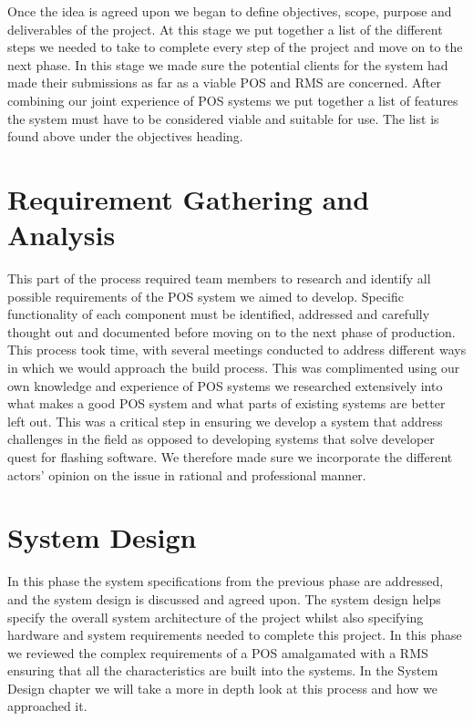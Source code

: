 Once the idea is agreed upon we began to define objectives, scope, purpose and deliverables of the project. At this stage we put together a list of the different steps we needed to take to complete every step of the project and move on to the next phase. In this stage we made sure the potential clients for the system had made their submissions as far as a viable POS and RMS are concerned.
After combining our joint experience of POS systems we put together a list of features the system must have to be considered viable and suitable for use. The list is found above under the objectives heading.

\section{Requirement Gathering and Analysis}

This part of the process required team members to research and identify all possible requirements of the POS system we aimed to develop. Specific functionality of each component must be identified, addressed and carefully thought out and documented before moving on to the next phase of production.
\newline
\newline
This process took time, with several meetings conducted to address different ways in which we would approach the build process. This was complimented using our own knowledge and experience of POS systems we researched extensively into what makes a good POS system and what parts of existing systems are better left out. This was a critical step in ensuring we develop a system that address challenges in the field as opposed to developing systems that solve developer quest for flashing software. We therefore made sure we incorporate the different actors’ opinion on the issue in rational and professional manner.

\section{System Design}

In this phase the system specifications from the previous phase are addressed, and the system design is discussed and agreed upon. The system design helps specify the overall system architecture of the project whilst also specifying hardware and system requirements needed to complete this project.  In this phase we reviewed the complex requirements of a POS amalgamated with a RMS ensuring that all the characteristics are built into the systems. In the System Design chapter we will take a more in depth look at this process and how we approached it.


